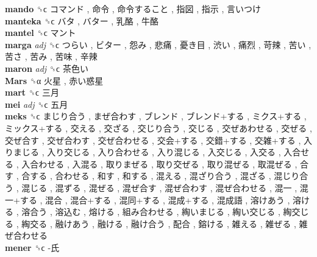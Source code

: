 \textbf{mando} ␝ϲ   コマンド ,  命令 ,  命令すること ,  指図 ,  指示 ,  言いつけ   \\
\textbf{manteka} ␝ϲ   バタ ,  バター ,  乳酪 ,  牛酪   \\
\textbf{mantel} ␝ϲ   マント   \\
\textbf{marga} \emph{adj}  ␝ϲ   つらい ,  ビター ,  怨み ,  悲痛 ,  憂き目 ,  渋い ,  痛烈 ,  苛辣 ,  苦い ,  苦さ ,  苦み ,  苦味 ,  辛辣   \\
\textbf{maron} \emph{adj}  ␝ϲ   茶色い   \\
\textbf{Mars} ␝α   火星 ,  赤い惑星   \\
\textbf{mart} ␝ϲ   三月   \\
\textbf{mei} \emph{adj}  ␝ϲ   五月   \\
\textbf{meks} ␝ϲ   まじり合う ,  まぜ合わす ,  ブレンド ,  ブレンド+する ,  ミクス+する ,  ミックス+する ,  交える ,  交ざる ,  交じり合う ,  交じる ,  交ぜあわせる ,  交ぜる ,  交ぜ合す ,  交ぜ合わす ,  交ぜ合わせる ,  交会+する ,  交錯+する ,  交雑+する ,  入りまじる ,  入り交じる ,  入り合わせる ,  入り混じる ,  入交じる ,  入交る ,  入合せる ,  入合わせる ,  入混る ,  取りまぜる ,  取り交ぜる ,  取り混ぜる ,  取混ぜる ,  合す ,  合する ,  合わせる ,  和す ,  和する ,  混える ,  混ざり合う ,  混ざる ,  混じり合う ,  混じる ,  混ずる ,  混ぜる ,  混ぜ合す ,  混ぜ合わす ,  混ぜ合わせる ,  混一 ,  混一+する ,  混合 ,  混合+する ,  混同+する ,  混成+する ,  混成語 ,  溶けあう ,  溶ける ,  溶合う ,  溶込む ,  熔ける ,  組み合わせる ,  綯いまじる ,  綯い交じる ,  綯交じる ,  綯交る ,  融けあう ,  融ける ,  融け合う ,  配合 ,  鎔ける ,  雑える ,  雑ぜる ,  雑ぜ合わせる   \\
\textbf{mener} ␝ϲ   -氏   \\
